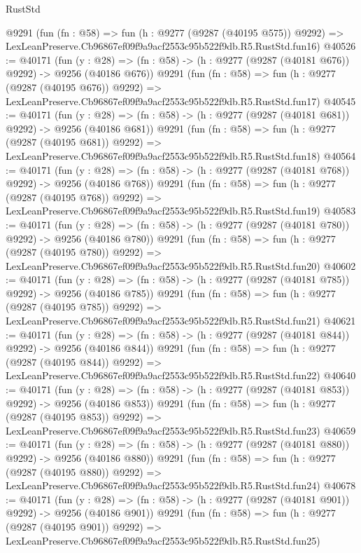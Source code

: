 \begin{lexlean}{RustStd}
\begin{coremodule}
    @9291
    (fun (fn : @58) =>
    fun (h : @9277 (@9287 (@40195 @575)) @9292) =>
    LexLeanPreserve.Cb96867ef09f9a9acf2553c95b522f9db.R5.RustStd.fun16)
@40526 := @40171
    (fun (y : @28) => (fn : @58) -> (h : @9277 (@9287 (@40181 @676)) @9292) -> @9256 (@40186 @676))
    @9291
    (fun (fn : @58) =>
    fun (h : @9277 (@9287 (@40195 @676)) @9292) =>
    LexLeanPreserve.Cb96867ef09f9a9acf2553c95b522f9db.R5.RustStd.fun17)
@40545 := @40171
    (fun (y : @28) => (fn : @58) -> (h : @9277 (@9287 (@40181 @681)) @9292) -> @9256 (@40186 @681))
    @9291
    (fun (fn : @58) =>
    fun (h : @9277 (@9287 (@40195 @681)) @9292) =>
    LexLeanPreserve.Cb96867ef09f9a9acf2553c95b522f9db.R5.RustStd.fun18)
@40564 := @40171
    (fun (y : @28) => (fn : @58) -> (h : @9277 (@9287 (@40181 @768)) @9292) -> @9256 (@40186 @768))
    @9291
    (fun (fn : @58) =>
    fun (h : @9277 (@9287 (@40195 @768)) @9292) =>
    LexLeanPreserve.Cb96867ef09f9a9acf2553c95b522f9db.R5.RustStd.fun19)
@40583 := @40171
    (fun (y : @28) => (fn : @58) -> (h : @9277 (@9287 (@40181 @780)) @9292) -> @9256 (@40186 @780))
    @9291
    (fun (fn : @58) =>
    fun (h : @9277 (@9287 (@40195 @780)) @9292) =>
    LexLeanPreserve.Cb96867ef09f9a9acf2553c95b522f9db.R5.RustStd.fun20)
@40602 := @40171
    (fun (y : @28) => (fn : @58) -> (h : @9277 (@9287 (@40181 @785)) @9292) -> @9256 (@40186 @785))
    @9291
    (fun (fn : @58) =>
    fun (h : @9277 (@9287 (@40195 @785)) @9292) =>
    LexLeanPreserve.Cb96867ef09f9a9acf2553c95b522f9db.R5.RustStd.fun21)
@40621 := @40171
    (fun (y : @28) => (fn : @58) -> (h : @9277 (@9287 (@40181 @844)) @9292) -> @9256 (@40186 @844))
    @9291
    (fun (fn : @58) =>
    fun (h : @9277 (@9287 (@40195 @844)) @9292) =>
    LexLeanPreserve.Cb96867ef09f9a9acf2553c95b522f9db.R5.RustStd.fun22)
@40640 := @40171
    (fun (y : @28) => (fn : @58) -> (h : @9277 (@9287 (@40181 @853)) @9292) -> @9256 (@40186 @853))
    @9291
    (fun (fn : @58) =>
    fun (h : @9277 (@9287 (@40195 @853)) @9292) =>
    LexLeanPreserve.Cb96867ef09f9a9acf2553c95b522f9db.R5.RustStd.fun23)
@40659 := @40171
    (fun (y : @28) => (fn : @58) -> (h : @9277 (@9287 (@40181 @880)) @9292) -> @9256 (@40186 @880))
    @9291
    (fun (fn : @58) =>
    fun (h : @9277 (@9287 (@40195 @880)) @9292) =>
    LexLeanPreserve.Cb96867ef09f9a9acf2553c95b522f9db.R5.RustStd.fun24)
@40678 := @40171
    (fun (y : @28) => (fn : @58) -> (h : @9277 (@9287 (@40181 @901)) @9292) -> @9256 (@40186 @901))
    @9291
    (fun (fn : @58) =>
    fun (h : @9277 (@9287 (@40195 @901)) @9292) =>
    LexLeanPreserve.Cb96867ef09f9a9acf2553c95b522f9db.R5.RustStd.fun25)

\end{coremodule}
\end{lexlean}
